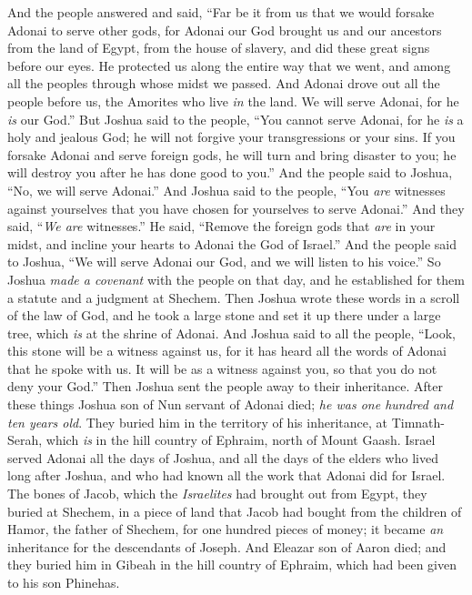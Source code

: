 \begin{biblechapter}
\verse And the people answered and said, “Far be it from us that we would forsake Adonai to serve other gods,
\verse for Adonai our God brought us and our ancestors from the land of Egypt, from the house of slavery, and did these great signs before our eyes. He protected us along the entire way that we went, and among all the peoples through whose midst we passed.
\verse And Adonai drove out all the people before us, the Amorites who live \textit{in} the land. We will serve Adonai, for he \textit{is} our God.”
\verse But Joshua said to the people, “You cannot serve Adonai, for he \textit{is} a holy and jealous God; he will not forgive your transgressions or your sins.
\verse If you forsake Adonai and serve foreign gods, he will turn and bring disaster to you; he will destroy you after he has done good to you.”
\verse And the people said to Joshua, “No, we will serve Adonai.”
\verse And Joshua said to the people, “You \textit{are} witnesses against yourselves that you have chosen for yourselves to serve Adonai.” And they said, “\textit{We are} witnesses.”
\verse He said, “Remove the foreign gods that \textit{are} in your midst, and incline your hearts to Adonai the God of Israel.”
\verse And the people said to Joshua, “We will serve Adonai our God, and we will listen to his voice.”
\verse So Joshua \textit{made a covenant} with the people on that day, and he established for them a statute and a judgment at Shechem.
\verse Then Joshua wrote these words in a scroll of the law of God, and he took a large stone and set it up there under a large tree, which \textit{is} at the shrine of Adonai.
\verse And Joshua said to all the people, “Look, this stone will be a witness against us, for it has heard all the words of Adonai that he spoke with us. It will be as a witness against you, so that you do not deny your God.”
\verse Then Joshua sent the people away to their inheritance.
\verse After these things Joshua son of Nun servant of Adonai died; \textit{he was one hundred and ten years old}.
\verse They buried him in the territory of his inheritance, at Timnath-Serah, which \textit{is} in the hill country of Ephraim, north of Mount Gaash.
\verse Israel served Adonai all the days of Joshua, and all the days of the elders who lived long after Joshua, and who had known all the work that Adonai did for Israel.
\verse The bones of Jacob, which the \textit{Israelites} had brought out from Egypt, they buried at Shechem, in a piece of land that Jacob had bought from the children of Hamor, the father of Shechem, for one hundred pieces of money; it became \textit{an} inheritance for the descendants of Joseph.
\verse And Eleazar son of Aaron died; and they buried him in Gibeah in the hill country of Ephraim, which had been given to his son Phinehas.
\end{biblechapter}

